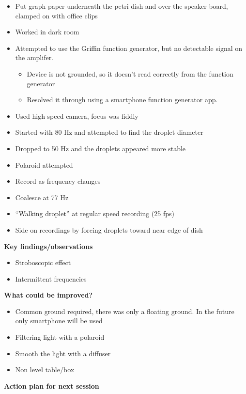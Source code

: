 \begin{itemize}
\item Put graph paper underneath the petri dish and over the speaker board, clamped on with office clips
\item Worked in dark room
\item Attempted to use the Griffin function generator, but no detectable signal on the amplifer.

\begin{itemize}
\item Device is not grounded, so it doesn't read correctly from the function generator
\item Resolved it through using a smartphone function generator app.
\end{itemize}
\item Used high speed camera, focus was fiddly
\item Started with 80 Hz and attempted to find the droplet diameter
\item Dropped to 50 Hz and the droplets appeared more stable
\item Polaroid attempted
\item Record as frequency changes
\item Coalesce at 77 Hz
\item {}``Walking droplet'' at regular speed recording (25 fps)
\item Side on recordings by forcing droplets toward near edge of dish
\end{itemize}
\bigskip

\textbf{Key findings/observations}

\begin{itemize}
\item Stroboscopic effect
\item Intermittent frequencies
\end{itemize}
\bigskip

\textbf{What could be improved?}

\begin{itemize}
\item Common ground required, there was only a floating ground. In the future only smartphone will be used
\item Filtering light with a polaroid
\item Smooth the light with a diffuser
\item Non level table/box
\end{itemize}
\bigskip

\textbf{Action plan for next session}


